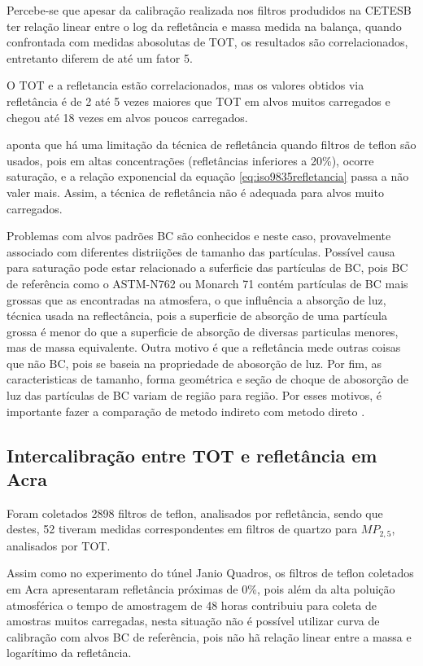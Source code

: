 Percebe-se que apesar da calibração realizada nos filtros produdidos na CETESB
ter relação linear entre o log da refletância e massa medida na balança, quando
confrontada com medidas abosolutas de TOT, os resultados são correlacionados, 
entretanto diferem de até um fator 5. 

O TOT e a refletancia estão correlacionados, mas os valores obtidos via 
refletância é de 2 até 5 vezes maiores que TOT em alvos muitos carregados e 
chegou até 18 vezes em alvos poucos carregados.

\citet{taha2007} aponta que há uma limitação da técnica de refletância quando 
filtros de teflon são usados, pois em altas concentrações (refletâncias
inferiores a 20\%), ocorre saturação, e a relação exponencial da equação 
\ref{eq:iso9835refletancia} passa a não valer mais. Assim, a técnica de
refletância não é adequada para alvos muito carregados.

Problemas com alvos padrões BC são conhecidos e neste caso, 
provavelmente associado com diferentes distriições de tamanho das partículas.
Possível causa para saturação pode estar relacionado a suferficie das partículas 
de BC, pois BC de referência como o ASTM-N762 ou Monarch 71 contém partículas
de BC mais grossas que as encontradas na atmosfera, o que influência a 
absorção de luz, técnica usada na reflectância, pois a superficie de absorção
de uma partícula grossa é menor do que a superficie de absorção de diversas
particulas menores, mas de massa equivalente. Outra motivo é que a refletância
mede outras coisas que não BC, pois se baseia na propriedade de abosorção de luz.
Por fim, as caracteristicas de tamanho, forma geométrica e seção de choque
de abosorção de luz das partículas de BC variam de região para região.
Por esses motivos, é importante fazer a comparação de metodo indireto com 
metodo direto \citep{quincey2007}.

\newpage
\subsection{Intercalibração entre TOT e refletância em Acra}

Foram coletados 2898 filtros de teflon, analisados por refletância,
sendo que destes, 52 tiveram medidas correspondentes em filtros de quartzo 
para $MP_{2,5}$, analisados por TOT.

Assim como no experimento do túnel Janio Quadros, os filtros de teflon 
coletados em Acra apresentaram refletância próximas de 0\%, pois além 
da alta poluição atmosférica o tempo de amostragem de 48 horas contribuiu 
para coleta de amostras muitos carregadas, nesta situação não é possível 
utilizar curva de calibração com alvos BC de referência, pois
não hã relação linear entre a massa e logarítimo da refletância.

